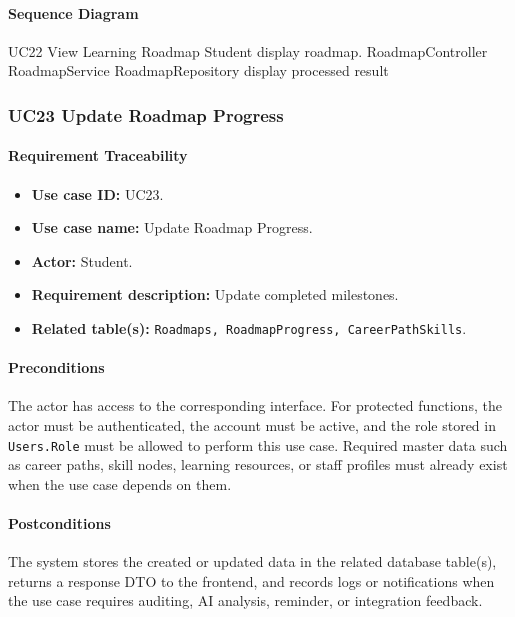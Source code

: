 \paragraph{Sequence Diagram}

\SequenceDiagram
{UC22 View Learning Roadmap}
{Student}
{display roadmap.}
{RoadmapController}
{RoadmapService}
{RoadmapRepository}
{display processed result}

\subsubsection{UC23 Update Roadmap Progress}

\paragraph{Requirement Traceability}

\begin{itemize}
    \item \textbf{Use case ID:} UC23.
    \item \textbf{Use case name:} Update Roadmap Progress.
    \item \textbf{Actor:} Student.
    \item \textbf{Requirement description:} Update completed milestones.
    \item \textbf{Related table(s):} \texttt{Roadmaps, RoadmapProgress, CareerPathSkills}.
\end{itemize}

\paragraph{Preconditions}

The actor has access to the corresponding interface. For protected functions, the actor must be authenticated, the account must be active, and the role stored in \texttt{Users.Role} must be allowed to perform this use case. Required master data such as career paths, skill nodes, learning resources, or staff profiles must already exist when the use case depends on them.

\paragraph{Postconditions}

The system stores the created or updated data in the related database table(s), returns a response DTO to the frontend, and records logs or notifications when the use case requires auditing, AI analysis, reminder, or integration feedback.

